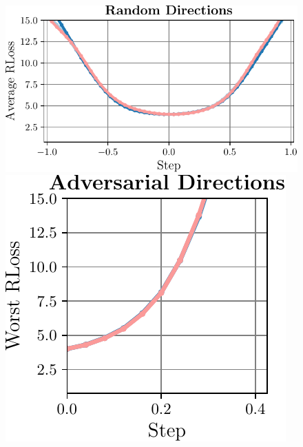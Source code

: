 \begin{figure}[t]
	\centering
	\vspace*{-0.2cm}
	\begin{minipage}[t]{0.26\textwidth}
		\vspace*{0px}
		\includegraphics[width=\textwidth]{plots_supp_scaling_random}
	\end{minipage}
	\begin{minipage}[t]{0.155\textwidth}
		\vspace*{0px}
		\includegraphics[width=\textwidth]{plots_supp_scaling_adversarial}
	\end{minipage}
	\hspace*{0.25cm}
	\begin{minipage}[t]{0.38\textwidth}

\end{minipage}
\end{figure}
